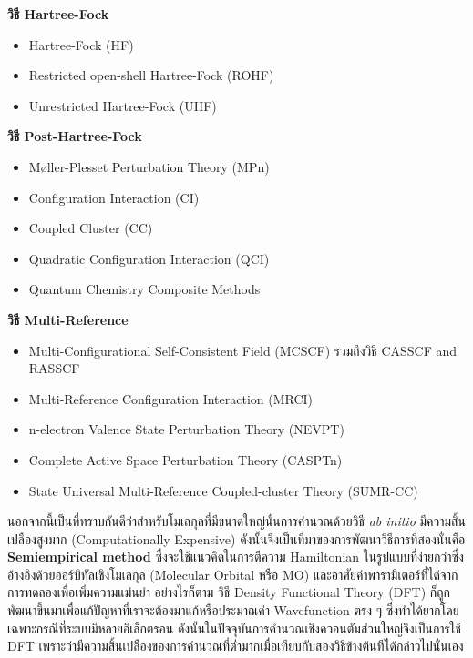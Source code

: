 \noindent \textbf{วิธี Hartree-Fock}
%
\begin{itemize}[topsep=0pt,noitemsep]\setlength\itemsep{0.5em}
    \item Hartree-Fock (HF)
    
    \item Restricted open-shell Hartree-Fock (ROHF)
    
    \item Unrestricted Hartree-Fock (UHF)
\end{itemize}

\noindent \textbf{วิธี Post-Hartree-Fock}
%
\begin{itemize}[topsep=0pt,noitemsep]\setlength\itemsep{0.5em}
    \item Møller-Plesset Perturbation Theory (MPn)
    
    \item Configuration Interaction (CI)
    
    \item Coupled Cluster (CC)
    
    \item Quadratic Configuration Interaction (QCI)
    
    \item Quantum Chemistry Composite Methods
\end{itemize}

\noindent \textbf{วิธี Multi-Reference}
%
\begin{itemize}[topsep=0pt,noitemsep]\setlength\itemsep{0.5em}
    \item Multi-Configurational Self-Consistent Field (MCSCF) รวมถึงวิธี CASSCF and RASSCF
    
    \item Multi-Reference Configuration Interaction (MRCI)
    
    \item n-electron Valence State Perturbation Theory (NEVPT)
    
    \item Complete Active Space Perturbation Theory (CASPTn)
    
    \item State Universal Multi-Reference Coupled-cluster Theory (SUMR-CC)
\end{itemize}

นอกจากนี้เป็นที่ทราบกันดีว่าสำหรับโมเลกุลที่มีขนาดใหญ่นั้นการคำนวณด้วยวิธี \textit{ab initio} มีความสิ้นเปลืองสูงมาก (Computationally Expensive)\autocite{grabowski2011} ดังนั้นจึงเป็นที่มาของการพัฒนาวิธีการที่สองนั่นคือ \textbf{Semiempirical method}\autocite{thiel2014,christensen2016,kriz2020} ซึ่งจะใช้แนวคิดในการตีความ Hamiltonian ในรูปแบบที่ง่ายกว่าซึ่งอ้างอิงด้วยออร์บิทัลเชิงโมเลกุล (Molecular Orbital หรือ MO) และอาศัยค่าพารามิเตอร์ที่ได้จากการทดลองเพื่อเพิ่มความแม่นยำ อย่างไรก็ตาม วิธี Density Functional Theory (DFT) ก็ถูกพัฒนาขึ้นมาเพื่อแก้ปัญหาที่เราจะต้องมาแก้หรือประมาณค่า Wavefunction ตรง ๆ ซึ่งทำได้ยากโดยเฉพาะกรณีที่ระบบมีหลายอิเล็กตรอน ดังนั้นในปัจจุบันการคำนวณเชิงควอนตัมส่วนใหญ่จึงเป็นการใช้ DFT เพราะว่ามีความสิ้นเปลืองของการคำนวณที่ต่ำมากเมื่อเทียบกับสองวิธีข้างต้นทีได้กล่าวไปนั่นเอง

